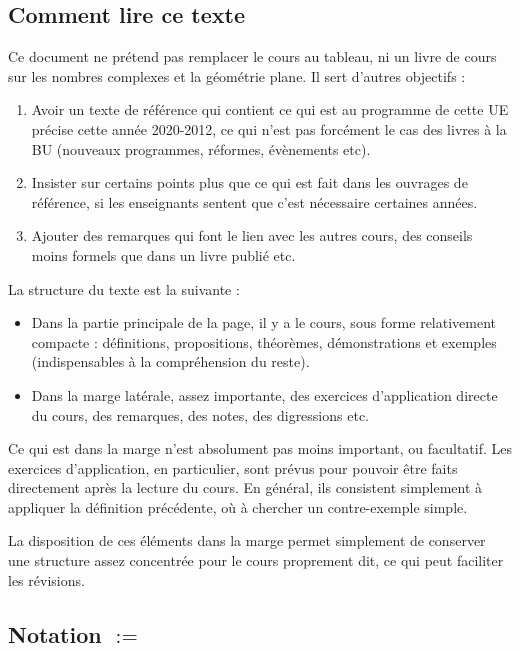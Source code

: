 \documentclass[11pt,a4paper,oneside]{book}
\theoremstyle{definition}
\theoremstyle{plain}
\begin{document}
\subsection{Comment lire ce texte}

Ce document ne prétend pas remplacer le cours au tableau, ni un livre de cours sur les nombres complexes et la géométrie plane. Il sert d'autres objectifs :


\begin{enumerate}
\item Avoir un texte de référence qui contient ce qui est au programme de cette UE précise cette année 2020-2012, ce qui n'est pas forcément le cas des livres à la BU (nouveaux programmes, réformes, évènements etc).
\item Insister sur certains points plus que ce qui est fait dans les ouvrages de référence, si les enseignants sentent que c'est nécessaire certaines années. 
\item Ajouter des remarques qui font le lien avec les autres cours, des conseils moins formels que dans un livre publié etc.
\end{enumerate}

La structure du texte est la suivante : 
\begin{itemize}
\item Dans la partie principale de la page, il y a le cours, sous forme relativement compacte : définitions, propositions, théorèmes, démonstrations et exemples (indispensables à la compréhension du reste).
\item Dans la marge latérale, assez importante, des exercices d'application directe du cours, des remarques, des notes, des digressions etc.
\end{itemize}

\begin{mdframed}
Ce qui est dans la marge n'est absolument pas \og moins important\fg, ou facultatif. Les exercices d'application, en particulier, sont prévus pour pouvoir être faits directement après la lecture du cours. En général, ils consistent simplement à appliquer la définition précédente, où à chercher un contre-exemple simple.

La disposition de ces éléments dans la marge permet simplement de conserver une structure assez concentrée pour le cours proprement dit, ce qui peut faciliter les révisions.
\end{mdframed}

\subsection{Notation \og $:=$\fg}
\end{document}
